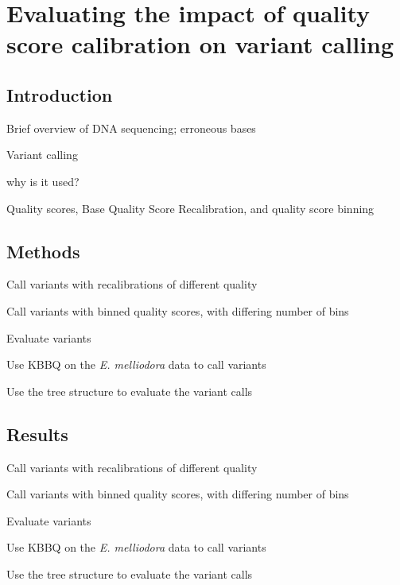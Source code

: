 \documentclass{report}
\begin{document}
\linenumbers

\chapter{Evaluating the impact of quality score calibration on variant calling}

\section{Introduction}
\begin{outline}
\item Brief overview of DNA sequencing; erroneous bases
\item Variant calling
	\begin{outline}
	\item why is it used?
	\end{outline}
\item Quality scores, Base Quality Score Recalibration, and quality score binning
\end{outline}

\section{Methods}
\begin{outline}
\item Call variants with recalibrations of different quality
\item Call variants with binned quality scores, with differing number of bins
\item Evaluate variants
\item Use KBBQ on the \textit{E. melliodora} data to call variants
\item Use the tree structure to evaluate the variant calls
\end{outline}

\section{Results}
\begin{outline}
\item Call variants with recalibrations of different quality
\item Call variants with binned quality scores, with differing number of bins
\item Evaluate variants
\item Use KBBQ on the \textit{E. melliodora} data to call variants
\item Use the tree structure to evaluate the variant calls
\end{outline}
\end{document}
